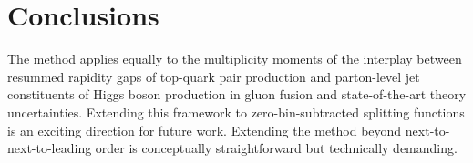 \section{Conclusions}\label{sec:conclusions}

The method applies equally to the multiplicity moments of the interplay
between resummed rapidity gaps of top-quark pair production and
parton-level jet constituents of Higgs boson production in gluon fusion
and state-of-the-art theory uncertainties. Extending this framework to
zero-bin-subtracted splitting functions is an exciting direction for
future work. Extending the method beyond next-to-next-to-leading order
is conceptually straightforward but technically demanding.


